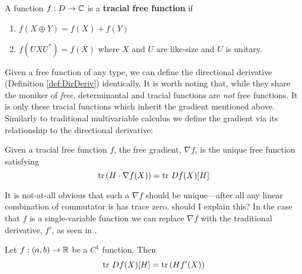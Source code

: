 \begin{definition}
  \label{def:TrFreeFun}
  A function \(f: D \to \mathbb{C} \) is a \textbf{tracial free function} if
  \begin{enumerate}
    \item \(f(X\oplus Y) = f(X)+f(Y)\)
    \item \(f(U X U^*) = f(X)\) where \(X\) and \(U\) are like-size
          and \(U\) is unitary.
  \end{enumerate}
\end{definition}

Given a free function of any type, we can define the directional derivative
(Definition \ref{def:DirDeriv}) identically. It is worth noting that, while they
share the moniker of \emph{free}, determinantal and tracial functions are
\emph{not} free functions.
It is only these tracial functions which inherit the gradient mentioned above.
Similarly to traditional multivariable calculus we define the gradient via its
relationship to the directional derivative:
\begin{definition}
\label{def:FreeGrad}
  Given a tracial free function \(f\), the free gradient, \(\nabla f\), is the
  unique free function satisfying
  \[
    \operatorname{tr} \left( H \cdot \nabla f(X) \right) = \operatorname{tr}\, Df(X)[H]
  \]
\end{definition}

It is not-at-all obvious that such a \(\nabla f \) should be unique---after all
any linear combination of commutator is has trace zero. {\color{red} should I
  explain this?} In the case that \(f\) is a single-variable function we can
replace \(\nabla f\) with the traditional derivative, \(f'\), as seen in
\cite[Thm 3.3]{pascoeTrace2020}.
\begin{theorem}
  Let \(f: (a,b)\to \mathbb{R} \) be a \(C^1\) function. Then
  \[
    \operatorname{tr} \, Df(X)[H] = \operatorname{tr} \left( Hf'(X) \right)
  \]
\end{theorem}

